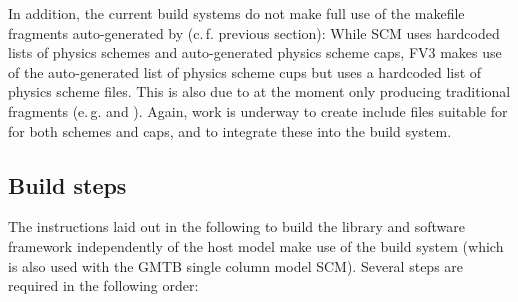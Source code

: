 In addition, the current build systems do not make full use of the makefile fragments auto-generated by  (c.\,f. previous section): While SCM uses hardcoded lists of physics schemes and auto-generated physics scheme caps, FV3 makes use of the auto-generated list of physics scheme cups but uses a hardcoded list of physics scheme files. This is also due to  at the moment only producing traditional  fragments (e.\,g.  and ). Again, work is underway to create include files suitable for  for both schemes and caps, and to integrate these into the build system.
\subsection{Build steps}\label{sec_ccpp_build_steps}
The instructions laid out in the following to build the library and software framework independently of the host model make use of the  build system (which is also used with the GMTB single column model SCM). Several steps are required in the following order:
